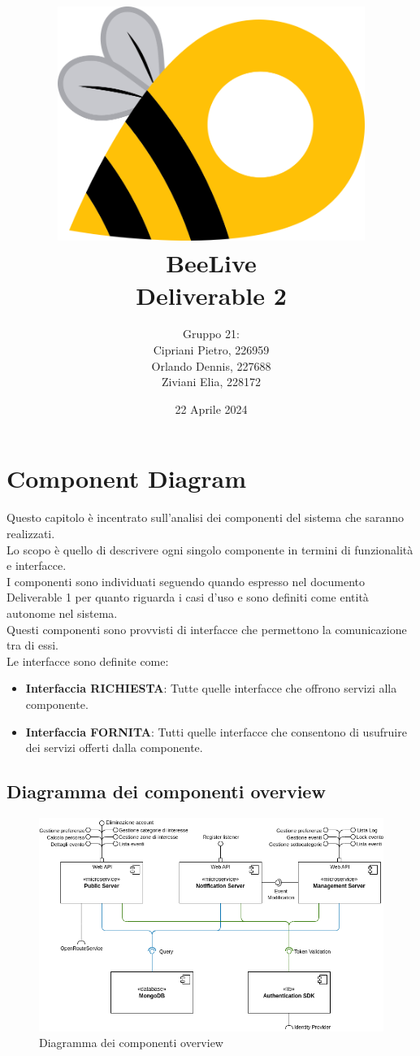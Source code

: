 \documentclass{article}
\title{\includegraphics[width=0.75\textwidth]{Images/BeeLive-Logo.png}\\\vspace{100pt}
\LARGE{\textbf{BeeLive\\Deliverable 2}}}
\author{Gruppo 21:\\
Cipriani Pietro, 226959\\
Orlando Dennis, 227688\\
Ziviani Elia, 228172}
\date{22 Aprile 2024}
\begin{document}
\maketitle
\thispagestyle{firstpage} %
\clearpage

\pagestyle{nonplain} %

\renewcommand{\contentsname}{Indice}
\tableofcontents

\clearpage

\section{Component Diagram}

Questo capitolo è incentrato sull'analisi dei componenti del sistema che saranno realizzati.\\
Lo scopo è quello di descrivere ogni singolo componente in termini di funzionalità e interfacce.\\

I componenti sono individuati seguendo quando espresso nel documento Deliverable 1 per quanto riguarda i casi d'uso e sono definiti come entità autonome nel sistema.\\
Questi componenti sono provvisti di interfacce che permettono la comunicazione tra di essi.\\
Le interfacce sono definite come:
\begin{itemize}
    \item \textbf{Interfaccia RICHIESTA}: Tutte quelle interfacce che offrono servizi alla componente.
    \item \textbf{Interfaccia FORNITA}: Tutti quelle interfacce che consentono di usufruire dei servizi offerti dalla componente.
\end{itemize} 

\subsection{Diagramma dei componenti overview}

\begin{figure}[htbp]
    \centering
    \includegraphics[width=1\textwidth]{Images/ComponentDiagram_overview.png}
    \caption{Diagramma dei componenti overview}
    \label{fig:component-diagram-overview}
\end{figure}
\end{document}
